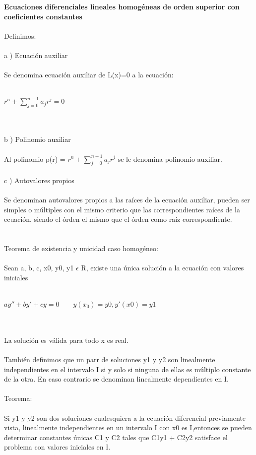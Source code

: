 \documentclass[a4paper,10pt]{article}
\begin{document}
\newpage

\textbf{Ecuaciones diferenciales lineales homogéneas de orden superior con coeficientes constantes}\\\\
Definimos:\\\\
a ) Ecuación auxiliar\\\\
Se denomina ecuación auxiliar de L(x)=0 a la ecuación:\\\\
\centerline{$r^n + \sum_{j=0}^{n-1} a_j r^j =0$}\\\\
b ) Polinomio auxiliar\\\\
Al polinomio p(r) = $r^n + \sum_{j=0}^{n-1} a_j r^j$ se le denomina polinomio auxiliar.\\\\
c ) Autovalores propios\\\\
Se denominan autovalores propios a las raíces de la ecuación auxiliar, pueden ser simples o múltiples con el mismo criterio que las correspondientes raíces de la ecuación, siendo el órden el mismo que el órden como raíz correspondiente.\\\\\\
Teorema de existencia y unicidad caso homogéneo:\\\\
Sean a, b, c, x0, y0, y1 $\epsilon$ R, existe una única solución a la ecuación con valores iniciales\\\\
\centerline{$ay'' + by' + cy = 0 \quad\quad y(x_0) = y0 , y'(x0) = y1 $}\\\\
La solución es válida para todo x es real.\\\\
También definimos que un parr de soluciones y1 y y2 son linealmente independientes en el intervalo I si y solo si ninguna de ellas es múltiplo constante de la otra. En caso contrario se denominan linealmente dependientes en I.\\\\
Teorema:\\\\
Si y1 y y2 son dos soluciones cualesquiera a la ecuación diferencial  previamente vista, linealmente independientes en un intervalo I con x0 es I,entonces se pueden determinar constantes únicas C1 y C2 tales que C1y1 + C2y2 satisface el problema con valores iniciales  en I.\\\\\\\
\end{document}
